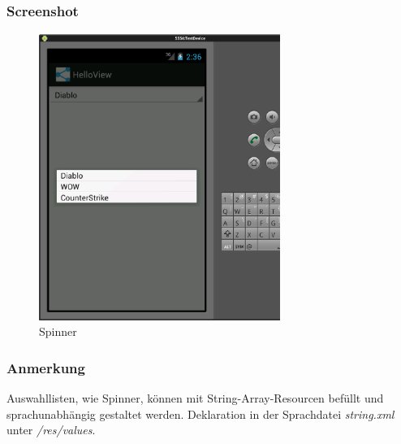 \begin{frame}
   \frametitle{Screenshot}
	\begin{figure}[h!]
	  \centering
	  \includegraphics[width=0.7\textwidth]{pictures/spinner.ps}
	  \caption{
		  Spinner
	  }
	  \label{fig:spinner}
	\end{figure}
\end{frame}


\begin{frame}
   \frametitle{Anmerkung}
	\begin{alertblock}
		Auswahllisten, wie Spinner, können mit String-Array-Resourcen befüllt und 
		sprachunabhängig gestaltet werden. Deklaration in der Sprachdatei 
		\emph{string.xml} unter \emph{/res/values}. 

		\vspace{3mm}

		
	\end{alertblock}
\end{frame}

